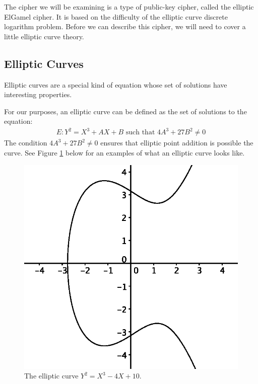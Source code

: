 \documentclass[12pt, a4paper, final]{report}
\begin{document}
The cipher we will be examining is a type of public-key cipher, called
the elliptic ElGamel cipher. It is based on the difficulty of the
elliptic curve discrete logarithm problem. Before we can describe this
cipher, we will need to cover a little elliptic curve theory.



\subsection{Elliptic Curves}

Elliptic curves are a special kind of equation whose set of solutions have
interesting properties.

For our purposes, an elliptic curve can be defined as the set of solutions
to the equation:
\begin{align*}
    E:Y^2 = X^3 + AX + B \text{ such that } 4A^3 + 27B^2 \neq 0
\end{align*}
The condition $4A^3 + 27B^2 \neq 0$ ensures that elliptic point addition is
possible the curve. See Figure \ref{fig:curve} below for an examples of what an
elliptic curve looks like.

\begin{figure}[h]
\centering
\includegraphics[]{images/curve.eps}
\caption{The elliptic curve $Y^2 = X^3 - 4X + 10$.}
\label{fig:curve}
\end{figure}
\end{document}
